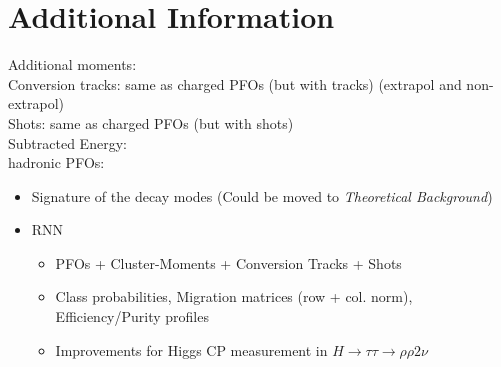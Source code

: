 \section{Additional Information}
Additional moments: \\
Conversion tracks: same as charged PFOs (but with tracks) (extrapol and non-extrapol) \\
Shots: same as charged PFOs (but with shots) \\
Subtracted Energy: \\
hadronic PFOs: \\

\begin{itemize}
\item Signature of the decay modes (Could be moved to \textit{Theoretical
    Background})
\item RNN
  \begin{itemize}
  \item PFOs + Cluster-Moments + Conversion Tracks + Shots
  \item Class probabilities, Migration matrices (row + col. norm),
    Efficiency/Purity profiles
  \item Improvements for Higgs CP measurement in
    $H \rightarrow \tau\tau \rightarrow \rho \rho 2\nu$
  \end{itemize}
\end{itemize}

